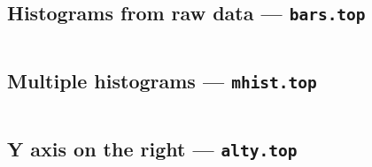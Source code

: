 \vspace{0.4cm}

\begin{verbatim}

\end{verbatim}

\vspace{0.4cm}
\def\epsfsize#1#2{\scaleb #1}

\newpage

\subsection{Histograms from raw data --- {\tt bars.top}}

\vspace{1cm}

\begin{verbatim}

\end{verbatim}

\vspace{1cm}
\def\epsfsize#1#2{\scalea #1}

\newpage

\subsection{Multiple histograms --- {\tt mhist.top}}

\vspace{0.4cm}

\begin{verbatim}

\end{verbatim}

\vspace{0.4cm}
\def\epsfsize#1#2{\scalec #1}

\newpage

\subsection{Y axis on the right --- {\tt alty.top}}

\vspace{0.4cm}

\begin{verbatim}

\end{verbatim}

\vspace{0.4cm}
\def\epsfsize#1#2{\scalec #1}

